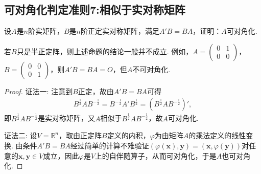 \documentclass[../../main.tex]{subfiles}%
\begin{document}
\subsection{可对角化判定准则7:相似于实对称矩阵}

\begin{proposition}\label{proposition:例9.72}
设\(A\)是\(n\)阶实矩阵，\(B\)是\(n\)阶正定实对称矩阵，满足\(A'B = BA\)，证明：\(A\)可对角化.
\end{proposition}
\begin{remark}
若\(B\)只是半正定阵，则上述命题的结论一般并不成立. 例如，\(A=\begin{pmatrix}0&1\\0&0\end{pmatrix}\)，\(B=\begin{pmatrix}0&0\\0&1\end{pmatrix}\)，则\(A'B = BA = O\)，但\(A\)不可对角化. 
\end{remark}
\begin{proof}

{\color{blue}证法一:}
注意到\(B\)正定，故由\(A'B = BA\)可得
\begin{align*}
B^{\frac{1}{2}}AB^{-\frac{1}{2}}=B^{-\frac{1}{2}}A'B^{\frac{1}{2}}=(B^{\frac{1}{2}}AB^{-\frac{1}{2}})',
\end{align*}
即\(B^{\frac{1}{2}}AB^{-\frac{1}{2}}\)是实对称矩阵，又\(A\)相似于\(B^{\frac{1}{2}}AB^{-\frac{1}{2}}\)，故\(A\)可对角化.

{\color{blue}证法二:}
设\(V = \mathbb{R}^n\)，取由正定阵\(B\)定义的内积，\(\varphi\)为由矩阵\(A\)的乘法定义的线性变换. 由条件\(A'B = BA\)经过简单的计算不难验证\((\varphi(\boldsymbol{x}),\boldsymbol{y}) = (\boldsymbol{x},\varphi(\boldsymbol{y}))\)对任意的\(\boldsymbol{x},\boldsymbol{y}\in V\)成立，因此\(\varphi\)是\(V\)上的自伴随算子，从而可对角化，于是\(A\)也可对角化.

\end{proof}
\end{document}
